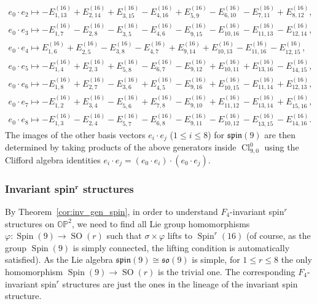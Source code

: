 \documentclass[pdftex]{sigma}
\numberwithin{equation}{section}
\DeclareMathOperator{\SO}{SO}
\DeclareMathOperator{\Spin}{Spin}
\DeclareMathOperator{\Cl}{Cl}
\begin{document}
		\begin{gather}
				e_0 \cdot e_2 \mapsto -E^{(16)}_{1,13} + E^{(16)}_{2,14} + E^{(16)}_{3,15} - E^{(16)}_{4,16} + E^{(16)}_{5,9} - E^{(16)}_{6,10} - E^{(16)}_{7,11} + E^{(16)}_{8,12} ,\nonumber
				\\
				e_0 \cdot e_3
				\mapsto -E^{(16)}_{1,7} - E^{(16)}_{2,8} - E^{(16)}_{3,5} - E^{(16)}_{4,6} - E^{(16)}_{9,15} - E^{(16)}_{10,16} - E^{(16)}_{11,13} - E^{(16)}_{12,14} ,\nonumber
				\\
				e_0 \cdot e_4
				\mapsto E^{(16)}_{1,6} + E^{(16)}_{2,5} - E^{(16)}_{3,8} - E^{(16)}_{4,7} + E^{(16)}_{9,14} + E^{(16)}_{10,13} - E^{(16)}_{11,16} - E^{(16)}_{12,15} ,\nonumber
				\\
				e_0 \cdot e_5
				\mapsto -E^{(16)}_{1,4} + E^{(16)}_{2,3} + E^{(16)}_{5,8} - E^{(16)}_{6,7} - E^{(16)}_{9,12} + E^{(16)}_{10,11} + E^{(16)}_{13,16} - E^{(16)}_{14,15} ,\nonumber
				\\
				e_0 \cdot e_6
				\mapsto -E^{(16)}_{1,8} + E^{(16)}_{2,7} - E^{(16)}_{3,6} + E^{(16)}_{4,5} - E^{(16)}_{9,16} + E^{(16)}_{10,15} - E^{(16)}_{11,14} + E^{(16)}_{12,13} ,\nonumber
				\\
				e_0 \cdot e_7
				\mapsto -E^{(16)}_{1,2} + E^{(16)}_{3,4} - E^{(16)}_{5,6} + E^{(16)}_{7,8} - E^{(16)}_{9,10} + E^{(16)}_{11,12} - E^{(16)}_{13,14} + E^{(16)}_{15,16} ,\nonumber
				\\
				e_0 \cdot e_8
				\mapsto -E^{(16)}_{1,3} - E^{(16)}_{2,4} - E^{(16)}_{5,7} - E^{(16)}_{6,8} - E^{(16)}_{9,11} - E^{(16)}_{10,12} - E^{(16)}_{13,15} - E^{(16)}_{14,16} .
				\label{eqn_number_spin9_partii}
		\end{gather}
		The images of the other basis vectors $e_i\cdot e_j$ ($1\leq i\leq 8$) for $\mathfrak{spin}(9)$ are then determined by taking products of the above generators inside $\Cl^{0}_{9,0}$ using the Clifford algebra identities $e_i\cdot e_j = (e_0\cdot e_i)\cdot (e_0\cdot e_j)$.
		
		\subsubsection[Invariant spin\^{}r structures]{Invariant spin$^{\boldsymbol{r}}$ structures}
		
		By Theorem~\ref{cor:inv_gen_spin}, in order to understand $F_4$-invariant spin$^r$ structures on $\mathbb{OP}^2$, we need to find all Lie group homomorphisms $ \varphi \colon \Spin(9) \to \SO(r)$ such that $\sigma \times \varphi$ lifts to $\Spin^r(16)$ (of course, as the group $\Spin(9)$ is simply connected, the lifting condition is automatically satisfied). As the Lie algebra $\mathfrak{spin}(9) \cong \mathfrak{so}(9)$ is simple, for $1 \leq r \leq 8$ the only homomorphism $\Spin(9)\to \SO(r)$ is the trivial one. The corresponding $F_4$-invariant spin$^r$ structures are just the ones in the lineage of the invariant spin structure.
		
\end{document}
